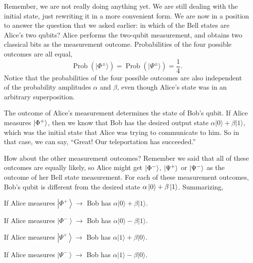 Remember, we are not really doing anything yet. 
We are still dealing with the initial state, just rewriting it in a more convenient form.
We are now in a position to answer the question that we asked earlier: in which of the Bell states are Alice's two qubits?
Alice performs the two-qubit measurement, and obtains two classical bits as the measurement outcome.
Probabilities of the four possible outcomes are all equal,
\begin{equation}
    \operatorname{Prob}\left(|\Phi^{\pm}\rangle\right)=\operatorname{Prob}\left(|\Psi^{\pm}\rangle\right)=\frac{1}{4}.
\end{equation}
Notice that the probabilities of the four possible outcomes are also independent of the probability amplitudes $\alpha$ and $\beta$, even though Alice's state was in an arbitrary superposition.

The outcome of Alice's measurement determines the state of Bob's qubit.
If Alice measures $\left| \Phi^+ \right\rangle$, then we know that Bob has the desired output state $\alpha|0\rangle+\beta|1\rangle$, which was the initial state that Alice was trying to communicate to him.
So in that case, we can say, ``Great! Our teleportation has succeeded.''

How about the other measurement outcomes?
Remember we said that all of these outcomes are equally likely, so Alice might get $\left| \Phi^- \right\rangle$, $\left| \Psi^+ \right\rangle$ or $\left| \Psi^- \right\rangle$ as the outcome of her Bell state measurement.
For each of these measurement outcomes, Bob's qubit is different from the desired state $\alpha\left| 0 \right\rangle+\beta\left| 1 \right\rangle$.
Summarizing,

\hspace{2cm} If Alice measures $\left|\Phi^{+}\right\rangle \rightarrow$ Bob has $\alpha|0\rangle+\beta|1\rangle$.

\hspace{2cm} If Alice measures $\left|\Phi^{-}\right\rangle \rightarrow$ Bob has $\alpha|0\rangle-\beta|1\rangle$.

\hspace{2cm} If Alice measures $\left|\Psi^{+}\right\rangle \rightarrow$ Bob has $\alpha|1\rangle+\beta|0\rangle$.

\hspace{2cm} If Alice measures $\left|\Psi^{-}\right\rangle \rightarrow$ Bob has $\alpha|1\rangle-\beta|0\rangle$.

